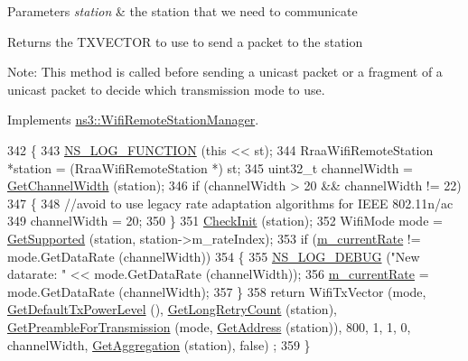 \begin{DoxyParams}{Parameters}
{\em station} & the station that we need to communicate\\
\hline
\end{DoxyParams}
\begin{DoxyReturn}{Returns}
the T\+X\+V\+E\+C\+T\+OR to use to send a packet to the station
\end{DoxyReturn}
Note\+: This method is called before sending a unicast packet or a fragment of a unicast packet to decide which transmission mode to use. 

Implements \hyperlink{classns3_1_1WifiRemoteStationManager_a5a6b2bfcd4959da43c54f0072bd01202}{ns3\+::\+Wifi\+Remote\+Station\+Manager}.


\begin{DoxyCode}
342 \{
343   \hyperlink{log-macros-disabled_8h_a90b90d5bad1f39cb1b64923ea94c0761}{NS\_LOG\_FUNCTION} (\textcolor{keyword}{this} << st);
344   RraaWifiRemoteStation *station = (RraaWifiRemoteStation *) st;
345   uint32\_t channelWidth = \hyperlink{classns3_1_1WifiRemoteStationManager_a918213c5b9fa629c4986f6d90521bbd4}{GetChannelWidth} (station);
346   \textcolor{keywordflow}{if} (channelWidth > 20 && channelWidth != 22)
347     \{
348       \textcolor{comment}{//avoid to use legacy rate adaptation algorithms for IEEE 802.11n/ac}
349       channelWidth = 20;
350     \}
351   \hyperlink{classns3_1_1RraaWifiManager_a14709913f823ce57563d4672a877d4c5}{CheckInit} (station);
352   WifiMode mode = \hyperlink{classns3_1_1WifiRemoteStationManager_a995c8bae0d84b168fd3e8bc9ecaacdd4}{GetSupported} (station, station->m\_rateIndex);
353   \textcolor{keywordflow}{if} (\hyperlink{classns3_1_1RraaWifiManager_a22d99170f7a381dd9f27716d9215dd92}{m\_currentRate} != mode.GetDataRate (channelWidth))
354     \{
355       \hyperlink{group__logging_ga413f1886406d49f59a6a0a89b77b4d0a}{NS\_LOG\_DEBUG} (\textcolor{stringliteral}{"New datarate: "} << mode.GetDataRate (channelWidth));
356       \hyperlink{classns3_1_1RraaWifiManager_a22d99170f7a381dd9f27716d9215dd92}{m\_currentRate} = mode.GetDataRate (channelWidth);
357     \}
358   \textcolor{keywordflow}{return} WifiTxVector (mode, \hyperlink{classns3_1_1WifiRemoteStationManager_acff2fc859ee6b4c66ea7a83dd075b5d6}{GetDefaultTxPowerLevel} (), 
      \hyperlink{classns3_1_1WifiRemoteStationManager_aac10b1403fb0bd670f8a8bd6d7e48304}{GetLongRetryCount} (station), \hyperlink{classns3_1_1WifiRemoteStationManager_a0f44967cbd7488baada4802ebc642110}{GetPreambleForTransmission} (mode, 
      \hyperlink{classns3_1_1WifiRemoteStationManager_ac9ccc8c514bd8d2af05c290e63461a2a}{GetAddress} (station)), 800, 1, 1, 0, channelWidth, \hyperlink{classns3_1_1WifiRemoteStationManager_a5421c8d510cb16eebeac9f2ea9dd73c3}{GetAggregation} (station), \textcolor{keyword}{false})
      ;
359 \}
\end{DoxyCode}


